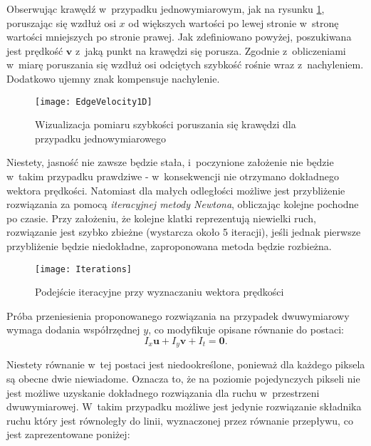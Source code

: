     \newpage
    Obserwując krawędź w~przypadku jednowymiarowym, jak na rysunku \ref{fig:EdgeVelocity1D}, poruszając się wzdłuż osi $x$ od większych wartości po lewej stronie w~stronę wartości mniejszych po stronie prawej. Jak zdefiniowano powyżej, poszukiwana jest prędkość $\mathbf{v}$ z~jaką punkt na krawędzi się porusza. Zgodnie z~obliczeniami w~miarę poruszania się wzdłuż osi odciętych szybkość rośnie wraz z~nachyleniem. Dodatkowo ujemny znak kompensuje nachylenie.

    \begin{figure}[!ht]
      \centering
      \texttt{[image: EdgeVelocity1D]}
      \caption[Wizualizacja pomiaru szybkości poruszania się krawędzi dla przypadku jednowymiarowego]{Wizualizacja pomiaru szybkości poruszania się krawędzi dla przypadku jednowymiarowego}
      \label{fig:EdgeVelocity1D}
    \end{figure}

    Niestety, jasność nie zawsze będzie stała, i~poczynione założenie nie będzie w~takim przypadku prawdziwe - w~konsekwencji nie otrzymano dokładnego wektora prędkości. Natomiast dla małych odległości możliwe jest przybliżenie rozwiązania za pomocą \textit{iteracyjnej metody Newtona}, obliczając kolejne pochodne po czasie. Przy założeniu, że kolejne klatki reprezentują niewielki ruch, rozwiązanie jest szybko zbieżne (wystarcza około 5 iteracji), jeśli jednak pierwsze przybliżenie będzie niedokładne, zaproponowana metoda będzie rozbieżna.

    \begin{figure}[!ht]
      \centering
      \texttt{[image: Iterations]}
      \caption[Podejście iteracyjne przy wyznaczaniu wektora prędkości]{Podejście iteracyjne przy wyznaczaniu wektora prędkości}
      \label{fig:Iterations}
    \end{figure}

    Próba przeniesienia proponowanego rozwiązania na przypadek dwuwymiarowy wymaga dodania współrzędnej $y$, co modyfikuje opisane równanie do postaci: \[I_{x}\mathbf{u} + I_{y}\mathbf{v} + I_{t} = \mathbf{0}. \]

    Niestety równanie w~tej postaci jest niedookreślone, ponieważ dla każdego piksela są obecne dwie niewiadome. Oznacza to, że na poziomie pojedynczych pikseli nie jest możliwe uzyskanie dokładnego rozwiązania dla ruchu w~przestrzeni dwuwymiarowej. W~takim przypadku możliwe jest jedynie rozwiązanie składnika ruchu który jest równoległy do linii, wyznaczonej przez równanie przepływu, co jest zaprezentowane poniżej:

